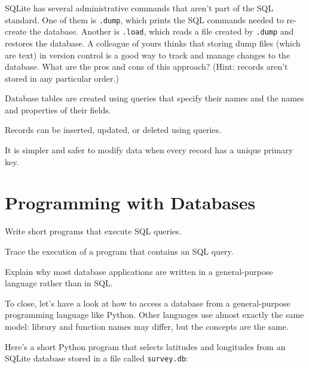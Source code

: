 \documentclass{book}
\begin{document}
\begin{challenge}
  SQLite has several administrative commands that aren't part of the SQL
  standard. One of them is \texttt{.dump}, which prints the SQL commands
  needed to re-create the database. Another is \texttt{.load}, which
  reads a file created by \texttt{.dump} and restores the database. A
  colleague of yours thinks that storing dump files (which are text) in
  version control is a good way to track and manage changes to the
  database. What are the pros and cons of this approach? (Hint: records
  aren't stored in any particular order.)
\end{challenge}

\begin{keypoints}
\begin{swcitemize}
\item
  Database tables are created using queries that specify their names and
  the names and properties of their fields.
\item
  Records can be inserted, updated, or deleted using queries.
\item
  It is simpler and safer to modify data when every record has a unique
  primary key.
\end{swcitemize}
\end{keypoints}

\section{Programming with Databases}

\begin{objectives}
\begin{swcitemize}
\item
  Write short programs that execute SQL queries.
\item
  Trace the execution of a program that contains an SQL query.
\item
  Explain why most database applications are written in a
  general-purpose language rather than in SQL.
\end{swcitemize}
\end{objectives}

To close, let's have a look at how to access a database from a
general-purpose programming language like Python. Other languages use
almost exactly the same model: library and function names may differ,
but the concepts are the same.

Here's a short Python program that selects latitudes and longitudes from
an SQLite database stored in a file called \texttt{survey.db}:
\end{document}

